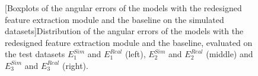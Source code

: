 \begin{figure}[t]
    \centering
    
    [Boxplots of the angular errors of the models with the redesigned feature extraction module and the baseline on the simulated datasets]{Distribution of the angular errors of the models with the redesigned feature extraction module and the baseline, evaluated on the test datasets $E^{Sim}_1$ and $E^{Real}_1$ (left), $E^{Sim}_2$ and $E^{Real}_2$ (middle) and $E^{Sim}_3$ and $E^{Real}_3$ (right).}
    \label{fig:boxplots_multiLoca_featureExtraction}
\end{figure}

